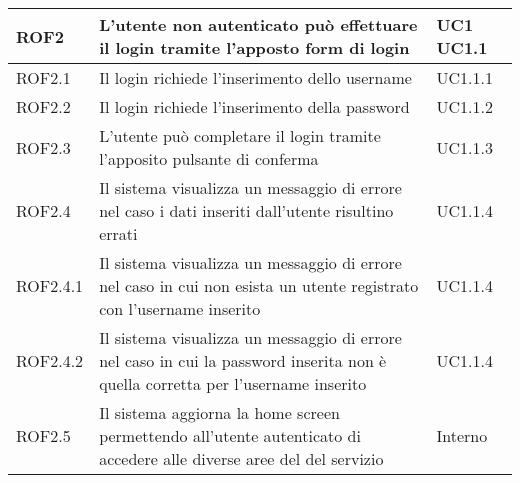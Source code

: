 \begin{center}
\begin{longtable}{| p{2.5cm} | p{8cm} | p{2cm} |}

		ROF2  &  L'utente non autenticato può effettuare il login tramite l'apposto form di login  &  UC1 \newline UC1.1 \\
		\hline
		ROF2.1  &  Il login richiede l'inserimento dello username  &  UC1.1.1 \\
		\hline
		ROF2.2  &  Il login richiede l'inserimento della password  &  UC1.1.2 \\
		\hline
		ROF2.3  &  L'utente può completare il login tramite l'apposito pulsante di conferma  &  UC1.1.3 \\
		\hline
		ROF2.4  &  Il sistema visualizza un messaggio di errore nel caso i dati inseriti dall'utente risultino errati  &  UC1.1.4 \\
		\hline
		ROF2.4.1  &  Il sistema visualizza un messaggio di errore nel caso in cui non esista un utente registrato con l'username inserito  &  UC1.1.4 \\
		\hline
		ROF2.4.2  &  Il sistema visualizza un messaggio di errore nel caso in cui la password inserita non è quella corretta per l'username inserito  &  UC1.1.4 \\
		\hline
		ROF2.5  &  Il sistema aggiorna la home screen permettendo all'utente autenticato di accedere alle diverse aree del del servizio  &  Interno  \\
		\hline



\end{longtable}
\end{center}
